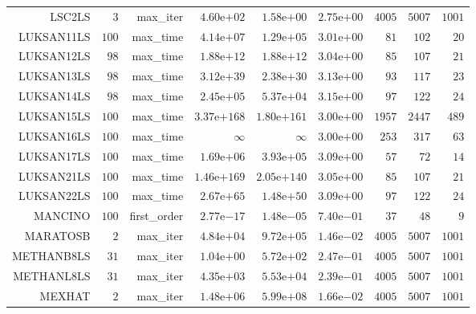 \begin{longtable}{rrrrrrrrr}
LSC2LS & \(     3\) & max\_iter & \( 4.60\)e\(+02\) & \( 1.58\)e\(+00\) & \( 2.75\)e\(+00\) & \(  4005\) & \(  5007\) & \(  1001\) \\
LUKSAN11LS & \(   100\) & max\_time & \( 4.14\)e\(+07\) & \( 1.29\)e\(+05\) & \( 3.01\)e\(+00\) & \(    81\) & \(   102\) & \(    20\) \\
LUKSAN12LS & \(    98\) & max\_time & \( 1.88\)e\(+12\) & \( 1.88\)e\(+12\) & \( 3.04\)e\(+00\) & \(    85\) & \(   107\) & \(    21\) \\
LUKSAN13LS & \(    98\) & max\_time & \( 3.12\)e\(+39\) & \( 2.38\)e\(+30\) & \( 3.13\)e\(+00\) & \(    93\) & \(   117\) & \(    23\) \\
LUKSAN14LS & \(    98\) & max\_time & \( 2.45\)e\(+05\) & \( 5.37\)e\(+04\) & \( 3.15\)e\(+00\) & \(    97\) & \(   122\) & \(    24\) \\
LUKSAN15LS & \(   100\) & max\_time & \(3.37\)e\(+168\) & \(1.80\)e\(+161\) & \( 3.00\)e\(+00\) & \(  1957\) & \(  2447\) & \(   489\) \\
LUKSAN16LS & \(   100\) & max\_time & \(\infty\) & \(\infty\) & \( 3.00\)e\(+00\) & \(   253\) & \(   317\) & \(    63\) \\
LUKSAN17LS & \(   100\) & max\_time & \( 1.69\)e\(+06\) & \( 3.93\)e\(+05\) & \( 3.09\)e\(+00\) & \(    57\) & \(    72\) & \(    14\) \\
LUKSAN21LS & \(   100\) & max\_time & \(1.46\)e\(+169\) & \(2.05\)e\(+140\) & \( 3.05\)e\(+00\) & \(    85\) & \(   107\) & \(    21\) \\
LUKSAN22LS & \(   100\) & max\_time & \( 2.67\)e\(+65\) & \( 1.48\)e\(+50\) & \( 3.09\)e\(+00\) & \(    97\) & \(   122\) & \(    24\) \\
MANCINO & \(   100\) & first\_order & \( 2.77\)e\(-17\) & \( 1.48\)e\(-05\) & \( 7.40\)e\(-01\) & \(    37\) & \(    48\) & \(     9\) \\
MARATOSB & \(     2\) & max\_iter & \( 4.84\)e\(+04\) & \( 9.72\)e\(+05\) & \( 1.46\)e\(-02\) & \(  4005\) & \(  5007\) & \(  1001\) \\
METHANB8LS & \(    31\) & max\_iter & \( 1.04\)e\(+00\) & \( 5.72\)e\(+02\) & \( 2.47\)e\(-01\) & \(  4005\) & \(  5007\) & \(  1001\) \\
METHANL8LS & \(    31\) & max\_iter & \( 4.35\)e\(+03\) & \( 5.53\)e\(+04\) & \( 2.39\)e\(-01\) & \(  4005\) & \(  5007\) & \(  1001\) \\
MEXHAT & \(     2\) & max\_iter & \( 1.48\)e\(+06\) & \( 5.99\)e\(+08\) & \( 1.66\)e\(-02\) & \(  4005\) & \(  5007\) & \(  1001\) \\

\end{longtable}

